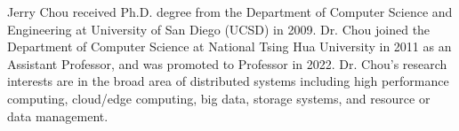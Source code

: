 
\vspace{-4em}
\begin{IEEEbiography}{Jerry Chou}
received Ph.D. degree from the Department of Computer Science and Engineering at University of San Diego (UCSD) in 2009. Dr. Chou joined the Department of Computer Science at National Tsing Hua University in 2011 as an Assistant Professor, and was promoted to  Professor in 2022. Dr. Chou’s research interests are in the broad area of distributed systems including high performance computing, cloud/edge computing, big data, storage systems, and resource or data management. 
\end{IEEEbiography}